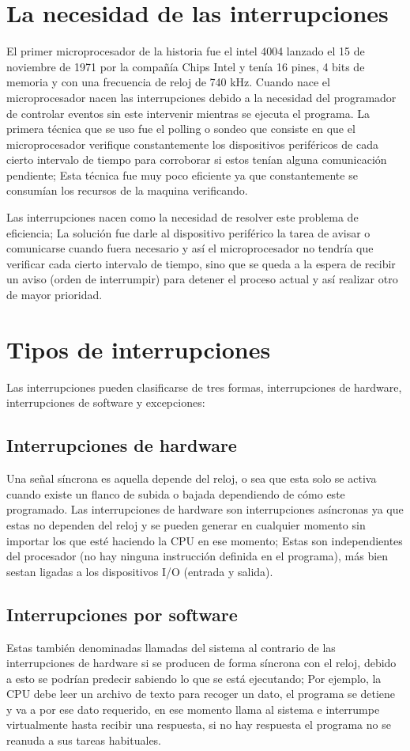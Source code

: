 \documentclass[11pt]{article}
\begin{document}
\section{La necesidad de las interrupciones}
El primer microprocesador de la historia fue el intel 4004 lanzado el 15 de noviembre de 1971 por la compañía Chips Intel y tenía 16 pines, 4 bits de memoria y con una frecuencia de reloj de 740 kHz. Cuando nace el microprocesador nacen las interrupciones debido a la necesidad del programador de controlar eventos sin este intervenir mientras se ejecuta el programa. La primera técnica que se uso fue el polling o sondeo que consiste en que el microprocesador verifique constantemente los dispositivos periféricos de cada cierto intervalo de tiempo para corroborar si estos tenían alguna comunicación pendiente; Esta técnica fue muy poco eficiente ya que constantemente se consumían los recursos de la maquina verificando.
\cite{polling}

Las interrupciones nacen como la necesidad de resolver este problema de eficiencia; La solución fue darle al dispositivo periférico la tarea de avisar o comunicarse cuando fuera necesario y así el microprocesador no tendría que verificar cada cierto intervalo de tiempo, sino que se queda a la espera de recibir un aviso (orden de interrumpir) para detener el proceso actual y así realizar otro de mayor prioridad.
\cite{interrupciones}

\section{Tipos de interrupciones}
Las interrupciones pueden clasificarse de tres formas, interrupciones de hardware, interrupciones de software y excepciones:

\subsection{Interrupciones de hardware}
Una señal síncrona es aquella depende del reloj, o sea que esta solo se activa cuando existe un flanco de subida o bajada dependiendo de cómo este programado. Las interrupciones de hardware son interrupciones asíncronas ya que estas no dependen del reloj y se pueden generar en cualquier momento sin importar los que esté haciendo la CPU en ese momento; Estas son independientes del procesador (no hay ninguna instrucción definida en el programa), más bien sestan ligadas a los dispositivos I/O (entrada y salida).

\subsection{Interrupciones por software}
Estas también denominadas llamadas del sistema al contrario de las interrupciones de hardware si se producen de forma síncrona con el reloj, debido a esto se podrían predecir sabiendo lo que se está ejecutando; Por ejemplo, la CPU debe leer un archivo de texto para recoger un dato, el programa se detiene y va a por ese dato requerido, en ese momento llama al sistema e interrumpe virtualmente hasta recibir una respuesta, si no hay respuesta el programa no se reanuda a sus tareas habituales.
\cite{interrupciones3}
\end{document}
